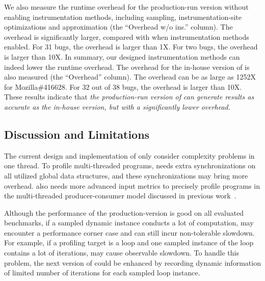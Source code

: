 We also measure the runtime overhead for the production-run 
version without enabling instrumentation methods, 
including sampling, instrumentation-site optimizations
and approximation (the ``Overhead w/o ins.'' column). 
The overhead is significantly larger, compared with when instrumentation methods enabled. 
For 31 bugs, the overhead is larger than 1X. 
For two bugs, the overhead is larger than 10X.
In summary, our designed instrumentation methods can 
indeed lower the runtime overhead. 
The overhead for the in-house version 
of \Tool is also measured 
(the ``Overhead'' column). 
The overhead can be as large as 1252X for 
Mozilla\#416628.
For 32 out of 38 bugs, the overhead is larger than 10X. 
These results indicate that \emph{the 
production-run version of \Tool can generate results as accurate as the in-house version,
but with a significantly lower overhead. }


\subsection{Discussion and Limitations}

The current design and implementation of \Tool 
only consider complexity problems in one thread. 
To profile multi-threaded programs, 
\Tool needs extra synchronizations on all utilized global data structures, 
and these synchronizations may bring more overhead. 
\Tool also needs more advanced input metrics to precisely profile programs 
in the multi-threaded producer-consumer 
model discussed in previous work~\cite{Aprof2}. 

Although the performance of the production-version 
is good on all evaluated benchmarks, 
if a sampled dynamic instance conducts a lot of computation, 
\Tool may encounter a performance corner case and can still incur non-tolerable slowdown.
For example, if a profiling target is a loop and 
one sampled instance of the loop contains a lot of iterations, 
\Tool may cause observable slowdown. 
To handle this problem, the next version of \Tool could 
be enhanced by recording dynamic information of limited number 
of iterations for each sampled loop instance. 



